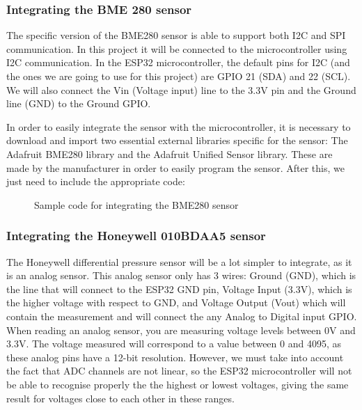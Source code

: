 \documentclass[12pt]{article}
\begin{document}
\subsubsection{Integrating the BME 280 sensor}

The specific version of the BME280 sensor is able to support both I2C and SPI communication. In this project it will be connected to the microcontroller using I2C communication. In the ESP32 microcontroller, the default pins for I2C (and the ones we are going to use for this project) are GPIO 21 (SDA) and 22 (SCL). We will also connect the Vin (Voltage input) line to the 3.3V pin and the Ground line (GND) to the Ground GPIO.\par

In order to easily integrate the sensor with the microcontroller, it is necessary to download and import two essential external libraries specific for the sensor: The Adafruit BME280 library and the Adafruit Unified Sensor library. These are made by the manufacturer in order to easily program the sensor. After this, we just need to include the appropriate code:

\begin{figure}[h]
\label{code:bme}

\centering
\caption{Sample code for integrating the BME280 sensor}
\end{figure}

\subsubsection{Integrating the Honeywell 010BDAA5 sensor}

The Honeywell differential pressure sensor will be a lot simpler to integrate, as it is an analog sensor. This analog sensor only has 3 wires: Ground (GND), which is the line that will connect to the ESP32 GND pin, Voltage Input (3.3V), which is the higher voltage with respect to GND, and Voltage Output (Vout) which will contain the measurement and will connect the any Analog to Digital input GPIO. When reading an analog sensor, you are measuring voltage levels between 0V and 3.3V. The voltage measured will correspond to a value between 0 and 4095, as these analog pins have a 12-bit resolution. However, we must take into account the fact that ADC channels are not linear, so the ESP32 microcontroller will not be able to recognise properly the the highest or lowest voltages, giving the same result for voltages close to each other in these ranges.\par
\end{document}
